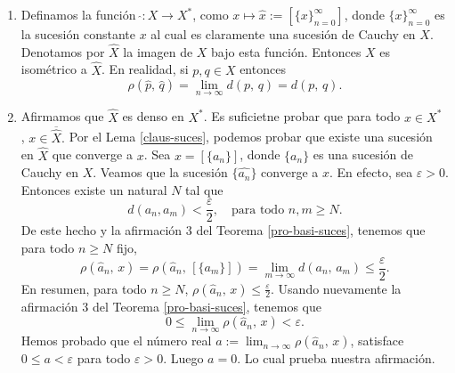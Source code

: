 \documentclass[x11names, 12pt]{book}
\DeclareMathOperator{\ene}{\mathbb{N}}
\DeclareMathOperator{\R}{\mathbb{R}}
\begin{document}
\begin{enumerate}
Probemos que $\rho$ está bien definida. Sean $\{a_n\}$ y $\{b_n\}$ sucesiones de Cauchy en $X$. Sea $x_n:=d(a_n, b_n)$. Afirmamos que $\{x_n\}$ es una sucesión de Cauchy en $\R$. En realidad para todo $m,n \in \ene$
\[|x_n-x_m|=|d(a_n, b_n)-d(a_m, b_m)| \leq d(a_n,a_m)+d(b_n,b_m).\]
Como $\{a_n\}$ y $\{b_n\}$ son sucesiones de Cauchy en $X$, la afirmación es cierta. Ahora bien, como $\{x_n\}$ es una sucesión de Cauchy en $\R$, entonces por el Teorema \ref{R-completo} es convergente. Esto nos da la buena definición de $\rho$. \\
Probemos que $\rho $ no depende de los representantes de las clases de equivalencia  
Sean $\{a'_n \}$ y $\{b'_n \}$ representantes de $[\{a_n \}]$ y $[\{b_n \}]$ respectivamente. Entonces
\[|d(a_n,b_n)-d(a'_n,b'n)|\leq d(a_n,a'_n)+d(b'_n, b_n).\]
Como $\lim_{n\to \infty}d(a_n,a'_n)=\lim_{n\to \infty}d(b_n,b'_n)=0$, entonces $\lim_{n\to \infty}|d(a_n,b_n)-d(a'_n,b'n)|=0$. De donde $\lim_{n\to \infty}d(a_n,b_n)=\lim_{n\to \infty}d(a'_n,b'n).$ Luego $\rho$ no depende de los representantes de las clases de equivalencia en la definición.\\
Veamos que $\rho$ es una métrica en $X^*$.
El hecho de que para todo $n$, $d(a_n,b_n)\geq 0$, que $d(a_n, b_n)=0$ si y sólo si $a_n=b_n$, y que $d(a_n, b_n)=d(b_n, a_n),$ implican que $\rho$ satisface las tres primeras condiciones en la definición de métrica. Veamos que también satisface la desigualdad triangular. En realidad, como para todo $n\in\ene$
\[d(a_n, b_n)\leq d(a_n, c_n)+d(c_n, b_n),\]
entonces del Teorema \ref{pro-basi-suces}, se sigue el resultado.

\item Definamos la función $\, \hat{}:X \to X^*$, como $x \mapsto \hat{x}:=[\{x\}_{n=0}^\infty]$, donde $\{x\}_{n=0}^\infty$ es la sucesión constante $x$ al cual es claramente una sucesión de Cauchy en $X$. Denotamos por $\hat{X}$ la imagen de $X$ bajo esta función.
Entonces $X$ es isométrico a $\hat{X}$. En realidad, si $p, q \in X$ entonces \[\rho(\hat{p}, \, \hat{q})= \lim_{n\to \infty} d(p, \, q)= d(p, \, q) .\]
\item Afirmamos que $\hat{X}$ es denso en $X^*$. Es suficietne probar que para todo $x\in X^*$ , $x\in \overline{\hat{X}}.$ Por el Lema \ref{claus-suces}, podemos probar que existe una sucesión en $\hat{X}$ que converge a $x$.  Sea $x=[\{a_n\}]$, donde $\{a_n\}$ es una sucesión de Cauchy en $X$. Veamos que la sucesión $\{\hat{a_n}\}$ converge a $x$.
 En efecto, sea $\varepsilon >0$. Entonces existe un natural $N$ tal que
\[d(a_n, a_m)<\frac{\varepsilon}{2}, \quad \text{para todo $n,m \geq N$}.\]
De este hecho y la afirmación 3 del Teorema \ref{pro-basi-suces}, tenemos que para todo $n \geq N$ fijo,
\[\rho (\hat {a}_n, \, x)=\rho (\hat {a}_n, \, [\{a_m\}])=\lim_{m\to\infty } d(a_n, \, a_m) \leq \frac{\varepsilon}{2}.\]
En resumen, para todo $n \geq N$, $\rho (\hat {a}_n, \, x) \leq \frac{\varepsilon}{2}.$ Usando nuevamente la afirmación 3 del Teorema \ref{pro-basi-suces}, tenemos que \[ 0\leq \lim_{n\to \infty} \rho (\hat {a}_n, \, x) < \varepsilon .\]
Hemos probado que el número real $a:=\lim_{n\to \infty} \rho (\hat {a}_n, \, x)$, satisface $0\leq a < \varepsilon$ para todo $\varepsilon >0.$ Luego $a=0$. Lo cual prueba nuestra afirmación.


\end{enumerate}
\end{document}

